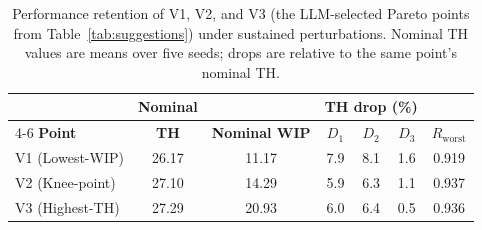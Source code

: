 \documentclass[a4paper,fleqn]{cas-sc}
\begin{document}
  \begin{table}[htbp]                                                                                                                       
  \centering                                                                                                                                
  \caption{Performance retention of V1, V2, and V3 (the LLM-selected                                                                        
  Pareto points from Table~\ref{tab:suggestions}) under sustained                                                                           
  perturbations. Nominal TH values are means over five seeds; drops are                                                                     
  relative to the same point's nominal TH. }                                                                                            
  \label{tab:res_selected}                                                                                                                  
  \begin{tabular}{@{}l c c c c c c@{}}                                                                                                      
  \toprule                                                                                                                                  
   & \textbf{Nominal} & & \multicolumn{3}{c}{\textbf{TH drop (\%)}} & \\                                                                    
  \cmidrule(l){4-6}                                                                                                                         
  \textbf{Point} & \textbf{TH} & \textbf{Nominal WIP} & $D_1$ & $D_2$ & $D_3$ & $R_\mathrm{worst}$ \\                                       
  \midrule                                                                                                                                  
  V1 (Lowest-WIP) & 26.17 & 11.17 & 7.9 & 8.1 & 1.6 & 0.919 \\                                                                              
  V2 (Knee-point) & 27.10 & 14.29 & 5.9 & 6.3 & 1.1 & 0.937 \\                                                                              
  V3 (Highest-TH) & 27.29 & 20.93 & 6.0 & 6.4 & 0.5 & 0.936 \\                                                                              
  \bottomrule                                               
  \end{tabular}
  \end{table}
\end{document}
